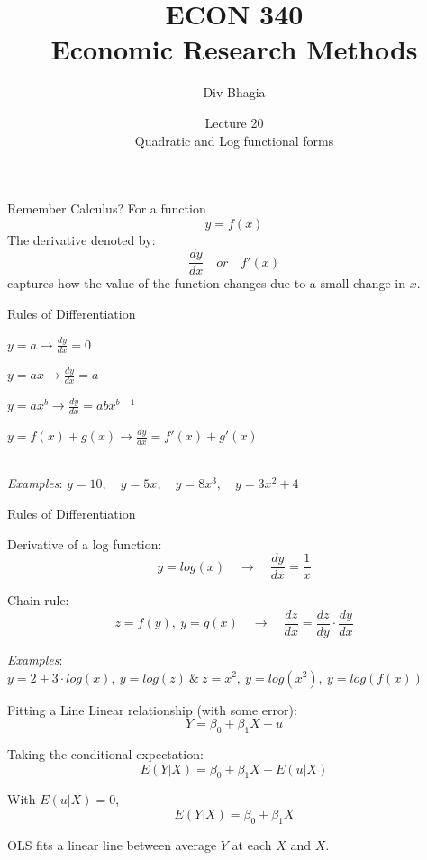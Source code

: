\documentclass{./../div_teaching_slides}
\begin{document}
\title{ECON 340 \\ Economic Research Methods}
\author{Div Bhagia}
\date{Lecture 20 \\ Quadratic and Log functional forms}

\begin{frame}
\maketitle
\end{frame}

\begin{frame}{Remember Calculus?}
For a function $$ y = f(x) $$
The derivative denoted by:
 $$\frac{dy}{dx} \quad or \quad f'(x) $$ captures how the value of the function changes due to a small change in $x$.
\end{frame}

\begin{frame}{Rules of Differentiation}
\begin{witemize}
\item $\displaystyle y=a  \rightarrow  \frac{dy}{dx}=0$
\item $\displaystyle y=ax \rightarrow \frac{dy}{dx}=a$
\item $\displaystyle y=ax^b \rightarrow  \frac{dy}{dx}=abx^{b-1}$
\item $\displaystyle y=f(x) + g(x) \rightarrow  \frac{dy}{dx}=f'(x) + g'(x)$ \\~\\
\end{witemize}
\textit{Examples}: $ y = 10,  \quad  y = 5x,  \quad y = 8x^3,  \quad y = 3x^2 + 4 $
\end{frame}


\begin{frame}{Rules of Differentiation}
\begin{witemize}
\item Derivative of a log function:
$$ y=log(x) \quad \rightarrow \quad \frac{dy}{dx}=\dfrac{1}{x}$$
\item Chain rule:
$$z=f(y),\ y=g(x) \quad \rightarrow \quad \frac{d z}{d x}=\dfrac{d z}{d y} \cdot \frac{d y}{d x}$$
\end{witemize}
\textit{Examples}: $ y = 2 + 3 \cdot log(x),\  y = log(z) \ \& \ z = x^2,\    y = log(x^2), \ y = log(f(x)) $
\end{frame}

\begin{frame}{Fitting a Line}
Linear relationship (with some error):
$$ Y = \beta_0 + \beta_1 X + u  $$

Taking the conditional expectation:
$$ E(Y | X) =  \beta_0 + \beta_1 X + E(u | X)  $$

With $E(u | X)=0$, 
$$ E(Y | X) =  \beta_0 + \beta_1 X   $$

OLS fits a linear line between average $Y$ at each $X$ and $X$. 
\end{frame}
\end{document}

